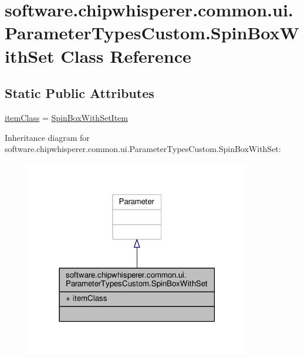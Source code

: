 \hypertarget{classsoftware_1_1chipwhisperer_1_1common_1_1ui_1_1ParameterTypesCustom_1_1SpinBoxWithSet}{}\section{software.\+chipwhisperer.\+common.\+ui.\+Parameter\+Types\+Custom.\+Spin\+Box\+With\+Set Class Reference}
\label{classsoftware_1_1chipwhisperer_1_1common_1_1ui_1_1ParameterTypesCustom_1_1SpinBoxWithSet}
\subsection*{Static Public Attributes}
\begin{DoxyCompactItemize}
\item 
\hyperlink{classsoftware_1_1chipwhisperer_1_1common_1_1ui_1_1ParameterTypesCustom_1_1SpinBoxWithSet_ac165e34ee797e08789f0232c115e02c6}{item\+Class} = \hyperlink{classsoftware_1_1chipwhisperer_1_1common_1_1ui_1_1ParameterTypesCustom_1_1SpinBoxWithSetItem}{Spin\+Box\+With\+Set\+Item}
\end{DoxyCompactItemize}


Inheritance diagram for software.\+chipwhisperer.\+common.\+ui.\+Parameter\+Types\+Custom.\+Spin\+Box\+With\+Set\+:\nopagebreak
\begin{figure}[H]
\begin{center}
\leavevmode
\includegraphics[width=278pt]{d3/d43/classsoftware_1_1chipwhisperer_1_1common_1_1ui_1_1ParameterTypesCustom_1_1SpinBoxWithSet__inherit__graph}
\end{center}
\end{figure}


